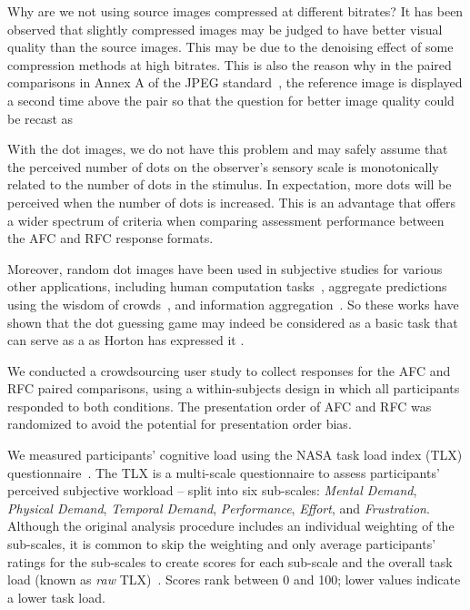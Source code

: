 \documentclass[a4paper,conference]{IEEEtran}
\begin{document}
Why are we not using source images compressed at different bitrates? It has been observed that slightly compressed images may be judged to have better visual quality than the source images. This may be due to the denoising effect of some compression methods at high bitrates. This is also the reason why in the paired comparisons in Annex A of the JPEG standard~\cite{ISOIEC2015}, the reference image is displayed a second time above the pair so that the question for better image quality could be recast as  

With the dot images, we do not have this problem and may safely assume that the perceived number of dots on the observer's sensory scale is monotonically related to the number of dots in the stimulus. In expectation, more dots will be perceived when the number of dots is increased. This is an advantage that offers a wider spectrum of criteria when comparing assessment performance between the AFC and RFC response formats.

 Moreover, random dot images have been used in subjective studies for various other applications, including human computation tasks~\cite{horton2010dot}, aggregate predictions using the wisdom of crowds~\cite{honda2022round,ugander2015wisdom,kemmer2020enhancing}, and information aggregation~\cite{pfeiffer2012adaptive}. So these works have shown that the dot guessing game may indeed be considered as a basic task that can serve as a  as Horton has expressed it \cite{horton2010dot}.


We conducted a crowdsourcing user study to collect responses for the AFC and RFC paired comparisons, using a within-subjects design in which all participants responded to both conditions. The presentation order of AFC and RFC was randomized to avoid the potential for presentation order bias. 

We measured participants' cognitive load using the NASA task load index (TLX) questionnaire~\cite{hart1988development}. The TLX is a multi-scale questionnaire to assess participants' perceived subjective workload -- split into six sub-scales:  \textit{Mental Demand}, \textit{Physical Demand}, \textit{Temporal Demand}, \textit{Performance}, \textit{Effort}, and 
 \textit{Frustration}. Although the original analysis procedure includes an individual weighting of the sub-scales, it is common to skip the weighting and only average participants' ratings for the sub-scales to create scores for each sub-scale and the overall task load (known as \textit{raw} TLX)~\cite{10.1145/3582272}. Scores rank between 0 and 100; lower values indicate a lower task load.
\end{document}
